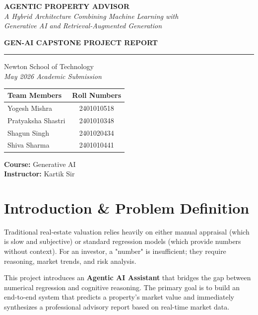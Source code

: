 \documentclass[12pt,a4paper]{article}
\begin{document}
\begin{titlepage}
    \centering
    \vspace*{1cm}
    {\Huge\bfseries\color{darkblue} AGENTIC PROPERTY ADVISOR} \\
    \vspace{0.5cm}
    {\large\itshape A Hybrid Architecture Combining Machine Learning with \\ Generative AI and Retrieval-Augmented Generation}

    \vspace{2cm}
    {\LARGE\bfseries GEN-AI CAPSTONE PROJECT REPORT}
    \vspace{0.5cm}
    \rule{0.8\textwidth}{0.5pt}

    \vspace{1.5cm}
    {\large Newton School of Technology\\[0.2em]
    \textit{May 2026 Academic Submission}}

    \vspace{1.5cm}
    \begin{tabular}{lc}
        \toprule
        \textbf{Team Members} & \textbf{Roll Numbers} \\
        \midrule
        Yogesh Mishra       & 2401010518 \\
        Pratyaksha Shastri  & 2401010348 \\
        Shagun Singh        & 2401020434 \\
        Shiva Sharma        & 2401010441 \\
        \bottomrule
    \end{tabular}

    \vspace{1.5cm}
    {\large \textbf{Course:} Generative AI\\[0.4em]
    \textbf{Instructor:} Kartik Sir}
    \vfill
\end{titlepage}

\section{Introduction \& Problem Definition}
Traditional real-estate valuation relies heavily on either manual appraisal (which is slow and subjective) or standard regression models (which provide numbers without context). For an investor, a "number" is insufficient; they require reasoning, market trends, and risk analysis.

This project introduces an \textbf{Agentic AI Assistant} that bridges the gap between numerical regression and cognitive reasoning. The primary goal is to build an end-to-end system that predicts a property's market value and immediately synthesizes a professional advisory report based on real-time market data.
\end{document}
